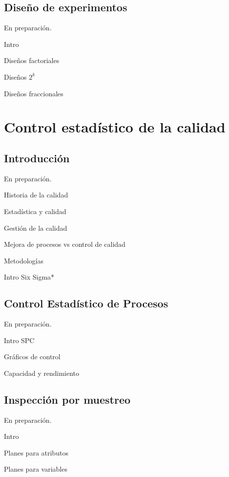 \documentclass[
]{book}
\begin{document}
\hypertarget{doe}{%
\chapter{Diseño de experimentos}\label{doe}}

En preparación.

Intro

Diseños factoriales

Diseños \(2^k\)

Diseños fraccionales

\hypertarget{part-control-estaduxedstico-de-la-calidad}{%
\part{Control estadístico de la calidad}\label{part-control-estaduxedstico-de-la-calidad}}

\hypertarget{introc}{%
\chapter{Introducción}\label{introc}}

En preparación.

Historia de la calidad

Estadística y calidad

Gestión de la calidad

Mejora de procesos vs control de calidad

Metodologías

Intro Six Sigma*

\hypertarget{spc}{%
\chapter{Control Estadístico de Procesos}\label{spc}}

En preparación.

Intro SPC

Gráficos de control

Capacidad y rendimiento

\hypertarget{aceptacion}{%
\chapter{Inspección por muestreo}\label{aceptacion}}

En preparación.

Intro

Planes para atributos

Planes para variables
\end{document}
